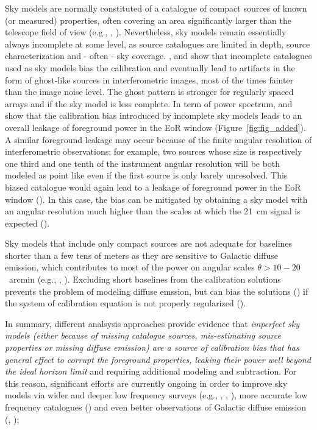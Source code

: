 \begin{itemize}
Sky models are normally constituted of a catalogue of compact sources of known (or measured) properties, often covering an area significantly larger than the telescope field of view (e.g., \cite{yatawatta13}, \cite{pober16}). Nevertheless, sky models remain essentially always incomplete at some level, as source catalogues are limited in depth, source characterization and - often - sky coverage. \cite{grobler14}, \cite{wijnholds16} and \cite{grobler16} show that incomplete catalogues used as sky models bias the calibration and eventually lead to artifacts in the form of ghost-like sources in interferometric images, most of the times fainter than the image noise level. The ghost pattern is stronger for regularly spaced arrays and if the sky model is less complete. In term of power spectrum, \cite{ewall-wice17} and \cite{barry16} show that the calibration bias introduced by incomplete sky models leads to an overall leakage of foreground power in the EoR window (Figure~\ref{fig:fig_added}). A similar foreground leakage may occur because of the finite angular resolution of interferometric observations: for example, two sources whose size is respectively one third and one tenth of the instrument angular resolution will be both modeled as point like even if the first source is only barely unresolved. This biased catalogue would again lead to a leakage of foreground power in the EoR window (\cite{procopio17}). In this case, the bias can be mitigated by obtaining a sky model with an angular resolution much higher than the scales at which the 21~cm signal is expected (\cite{procopio17}).

Sky models that include only compact sources are not adequate for baselines shorter than a few tens of meters as they are sensitive to Galactic diffuse emission, which contributes to most of the power on angular scales $\theta > 10-20$~arcmin (e.g., \cite{bernardi09}, \cite{choudhuri17}). Excluding short baselines from the calibration solutions prevents the problem of modeling diffuse emssion, but can bias the solutions (\cite{patil16}) if the system of calibration equation is not properly regularized (\cite{sardabaradi19}).

In summary, different analsysis approaches provide evidence that {\it imperfect sky models (either because of missing catalogue sources, mis-estimating source properties or missing diffuse emission) are a source of calibration bias that has general effect to corrupt the foreground properties, leaking their power well beyond the ideal horizon limit} and requiring additional modeling and subtraction. For this reason, significant efforts are currently ongoing in order to improve sky models via wider and deeper low frequency surveys (e.g., \cite{hurley-walker17}, \cite{intema17}, \cite{shimwell19}), more accurate low frequency catalogues (\cite{carroll16}) and even better observations of Galactic diffuse emission (\cite{zheng17}, \cite{dowell17}); 


\end{itemize}
